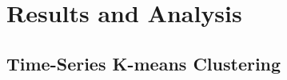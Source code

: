 \documentclass[11pt]{amsart}
\begin{document}



\section{Results and Analysis}

\subsection{Time-Series K-means Clustering}

\end{document}
